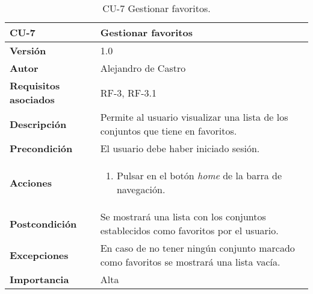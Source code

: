 \begin{table}[p]
	\centering
	\begin{tabularx}{\linewidth}{ p{} p{} }
		\toprule
		\textbf{CU-7}    & \textbf{Gestionar favoritos}\\
		\toprule
		\textbf{Versión}              & 1.0    \\
		\textbf{Autor}                & {Alejandro de Castro} \\
		\textbf{Requisitos asociados} & RF-3, RF-3.1 \\
		\textbf{Descripción}          & Permite al usuario visualizar una lista de los conjuntos que tiene en favoritos. \\
		\textbf{Precondición}         & El usuario debe haber iniciado sesión. \\
        \textbf{Acciones}             &
		\begin{enumerate}
			\def\labelenumi{\arabic{enumi}.}
			\tightlist
			\item Pulsar en el botón \textit{home} de la barra de navegación.
		\end{enumerate}\\ 
		\textbf{Postcondición}        & Se mostrará una lista con los conjuntos establecidos como favoritos por el usuario. \\
		\textbf{Excepciones}          & En caso de no tener ningún conjunto marcado como favoritos se mostrará una lista vacía. \\
		\textbf{Importancia}          & Alta \\
		\bottomrule
	\end{tabularx}
	\caption{CU-7 Gestionar favoritos.}
\end{table}

